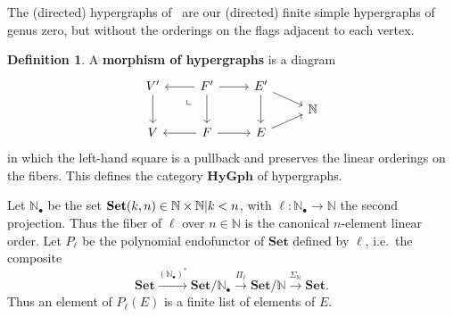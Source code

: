 \documentclass{article}
\theoremstyle{definition}
\newtheorem{defn}[thm]{Definition}
\theoremstyle{remark}
\let\setof\Set
\def\Set{\mathbf{Set}}
\newcommand{\dlpullback}[1][dl]{\ar[#1,phantom,near start,"\llcorner"]}
\let\xto\xrightarrow
\def\N{\mathbb{N}}
\def\Np{\N_{\bullet}}
\def\hy{\mathbf{HyGph}}
\begin{document}
The (directed) hypergraphs of~\cite{glpn:directed-hypergraphs} are our (directed) finite simple hypergraphs of genus zero, but without the orderings on the flags adjacent to each vertex.

\begin{defn}
  A \textbf{morphism of hypergraphs} is a diagram
  \[
  \begin{tikzcd}[row sep=tiny]
    V' \ar[dd] & F' \ar[dd] \ar[r] \ar[l] \dlpullback[ddl] & E' \ar[dr] \ar[dd]\\
    &&& \N\\
    V  & F \ar[r] \ar[l] & E \ar[ur]
  \end{tikzcd}
  \]
  in which the left-hand square is a pullback and preserves the linear orderings on the fibers.
  This defines the category $\hy$ of hypergraphs.
\end{defn}

Let $\Np$ be the set $\setof{(k,n) \in \N\times \N | k<n}$, with $\ell:\Np\to \N$ the second projection.
Thus the fiber of $\ell$ over $n\in\N$ is the canonical $n$-element linear order.
Let $P_\ell$ be the polynomial endofunctor of $\Set$ defined by $\ell$, i.e.\ the composite
\[ \Set \xto{(\Np)^*} \Set/\Np \xto{\Pi_\ell} \Set/\N \xto{\Sigma_\N} \Set.\]
Thus an element of $P_\ell(E)$ is a finite list of elements of $E$.
\end{document}
